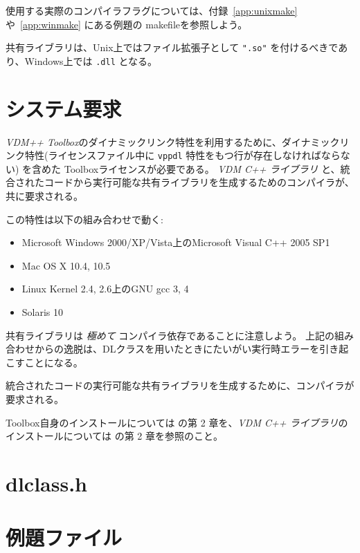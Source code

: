 \documentclass[\pformat,12pt]{jarticle}
\begin{document}
使用する実際のコンパイラフラグについては、付録~\ref{app:unixmake}や~\ref{app:winmake} にある例題の makefileを参照しよう。

共有ライブラリは、Unix上ではファイル拡張子として {\tt ".so"} を付けるべきであり、Windows上では \texttt{.dll} となる。 

\newpage


\newpage
\appendix

\section{システム要求}
\label{sec:sysreq}

 {\it VDM++ Toolbox}のダイナミックリンク特性を利用するために、ダイナミックリンク特性(ライセンスファイル中に {\tt vppdl} 特性をもつ行が存在しなければならない) 
を含めた Toolboxライセンスが必要である。
 {\it VDM  C++ ライブラリ} と、統合されたコードから実行可能な共有ライブラリを生成するためのコンパイラが、共に要求される。

この特性は以下の組み合わせで動く:
\begin{itemize}
\item Microsoft Windows 2000/XP/Vista上のMicrosoft Visual C++ 2005 SP1
\item Mac OS X 10.4, 10.5
\item Linux Kernel 2.4, 2.6上のGNU gcc 3, 4
\item Solaris 10
\end{itemize}

共有ライブラリは \textit{極めて} コンパイラ依存であることに注意しよう。
上記の組み合わせからの逸脱は、DLクラスを用いたときにたいがい実行時エラーを引き起こすことになる。

統合されたコードの実行可能な共有ライブラリを生成するために、コンパイラが要求される。
 
Toolbox自身のインストールについては \cite{UserManPP-SCSK}の第 2 章を、{\it VDM C++ ライブラリ}のインストールについては \cite{CGManPP-SCSK}の第 2 章を参照のこと。

\newpage
\section{dlclass.h}\label{app:dlclass_h}



\newpage
\section{例題ファイル}\label{app:interfacelayer}
\end{document}
